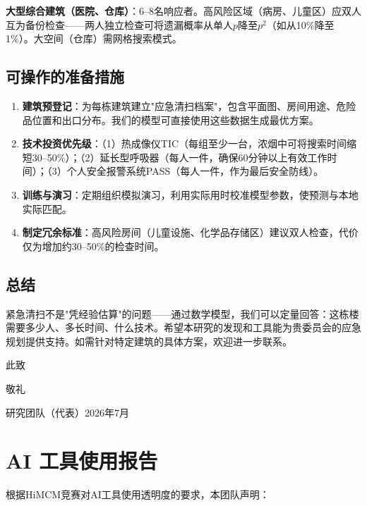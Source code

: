 \documentclass[12pt,a4paper]{ctexart}
\begin{document}
{\textbf{大型综合建筑（医院、仓库）}：6--8名响应者。高风险区域（病房、儿童区）应双人互为备份检查——两人独立检查可将遗漏概率从单人$p$降至$p^2$（如从10\%降至1\%）。大空间（仓库）需网格搜索模式。

\subsection*{可操作的准备措施}

\begin{enumerate}[nosep]
    \item \textbf{建筑预登记}：为每栋建筑建立"应急清扫档案"，包含平面图、房间用途、危险品位置和出口分布。我们的模型可直接使用这些数据生成最优方案。
    \item \textbf{技术投资优先级}：（1）热成像仪TIC（每组至少一台，浓烟中可将搜索时间缩短30--50\%）；（2）延长型呼吸器（每人一件，确保60分钟以上有效工作时间）；（3）个人安全报警系统PASS（每人一件，作为最后安全防线）。
    \item \textbf{训练与演习}：定期组织模拟演习，利用实际用时校准模型参数，使预测与本地实际匹配。
    \item \textbf{制定冗余标准}：高风险房间（儿童设施、化学品存储区）建议双人检查，代价仅为增加约30--50\%的检查时间。
\end{enumerate}

\subsection*{总结}

紧急清扫不是"凭经验估算"的问题——通过数学模型，我们可以定量回答：这栋楼需要多少人、多长时间、什么技术。希望本研究的发现和工具能为贵委员会的应急规划提供支持。如需针对特定建筑的具体方案，欢迎进一步联系。

\vspace{18pt}
\noindent 此致

\noindent 敬礼

\vspace{10pt}
\noindent 研究团队（代表）\hfill 2026年7月
}

\newpage
\section*{AI 工具使用报告}

根据HiMCM竞赛对AI工具使用透明度的要求，本团队声明：
\end{document}

